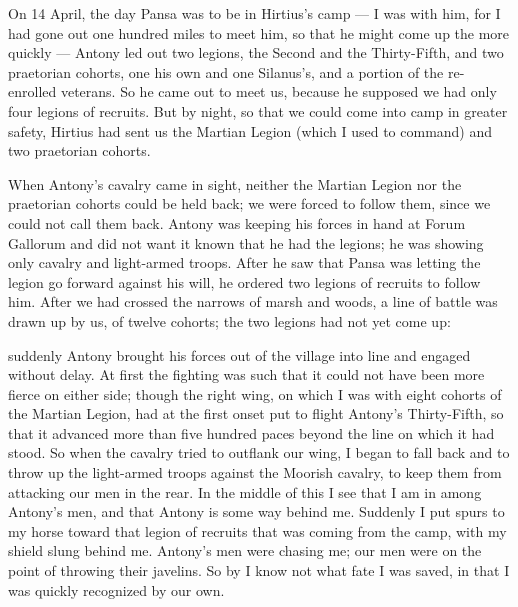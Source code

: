 

 On 14 April, the day Pansa was to be in Hirtius's camp --- I was with him, for I had gone out one hundred miles to meet him, so that he might come up the more quickly --- Antony led out two legions, the Second and the Thirty-Fifth, and two praetorian cohorts, one his own and one Silanus's, and a portion of the re-enrolled veterans. So he came out to meet us, because he supposed we had only four legions of recruits. But by night, so that we could come into camp in greater safety, Hirtius had sent us the Martian Legion (which I used to command) and two praetorian cohorts.

 When Antony's cavalry came in sight, neither the Martian Legion nor the praetorian cohorts could be held back; we were forced to follow them, since we could not call them back. Antony was keeping his forces in hand at Forum Gallorum and did not want it known that he had the legions; he was showing only cavalry and light-armed troops. After he saw that Pansa was letting the legion go forward against his will, he ordered two legions of recruits to follow him. After we had crossed the narrows of marsh and woods, a line of battle was drawn up by us, of twelve cohorts; the two legions had not yet come up:

 suddenly Antony brought his forces out of the village into line and engaged without delay. At first the fighting was such that it could not have been more fierce on either side; though the right wing, on which I was with eight cohorts of the Martian Legion, had at the first onset put to flight Antony's Thirty-Fifth, so that it advanced more than five hundred paces beyond the line on which it had stood. So when the cavalry tried to outflank our wing, I began to fall back and to throw up the light-armed troops against the Moorish cavalry, to keep them from attacking our men in the rear. In the middle of this I see that I am in among Antony's men, and that Antony is some way behind me. Suddenly I put spurs to my horse toward that legion of recruits that was coming from the camp, with my shield slung behind me. Antony's men were chasing me; our men were on the point of throwing their javelins. So by I know not what fate I was saved, in that I was quickly recognized by our own.

